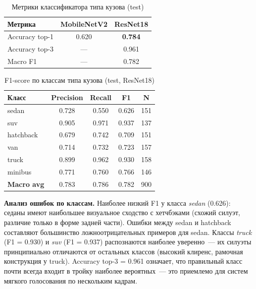 \documentclass[14pt,a4paper]{report}
\numberwithin{equation}{chapter}
\numberwithin{figure}{chapter}
\numberwithin{table}{chapter}
\begin{document}
\begin{table}[H]
\centering
\caption{Метрики классификатора типа кузова (test)}
\label{tab:body_metrics}
\begin{tabular}{lcc}
\toprule
\textbf{Метрика} & \textbf{MobileNetV2} & \textbf{ResNet18} \\
\midrule
Accuracy top-1 & 0.620 & \textbf{0.784} \\
Accuracy top-3 & --- & 0.961 \\
Macro F1       & --- & 0.782 \\
\bottomrule
\end{tabular}
\end{table}

\begin{table}[H]
\centering
\caption{F1-score по классам типа кузова (test, ResNet18)}
\label{tab:body_per_class}
\begin{tabular}{lcccc}
\toprule
\textbf{Класс} & \textbf{Precision} & \textbf{Recall} & \textbf{F1} & \textbf{N} \\
\midrule
sedan     & 0.728 & 0.550 & 0.626 & 151 \\
suv       & 0.905 & 0.971 & 0.937 & 137 \\
hatchback & 0.679 & 0.742 & 0.709 & 151 \\
van       & 0.714 & 0.732 & 0.723 & 157 \\
truck     & 0.899 & 0.962 & 0.930 & 158 \\
minibus   & 0.771 & 0.760 & 0.766 & 146 \\
\midrule
\textbf{Macro avg} & 0.783 & 0.786 & 0.782 & 900 \\
\bottomrule
\end{tabular}
\end{table}

\textbf{Анализ ошибок по классам.}
Наиболее низкий F1 у класса \textit{sedan} (0.626): седаны
имеют наибольшее визуальное сходство с хетчбэками
(схожий силуэт, различие только в форме задней части).
Ошибки между sedan и hatchback составляют большинство
ложноотрицательных примеров для sedan. Классы \textit{truck}
(F1 = 0.930) и \textit{suv} (F1 = 0.937) распознаются
наиболее уверенно~--- их силуэты принципиально отличаются
от остальных классов (высокий клиренс, рамочная конструкция
у truck). Accuracy top-3 = 0.961 означает, что правильный
класс почти всегда входит в тройку наиболее вероятных~---
это приемлемо для систем мягкого голосования по нескольким кадрам.
\end{document}
